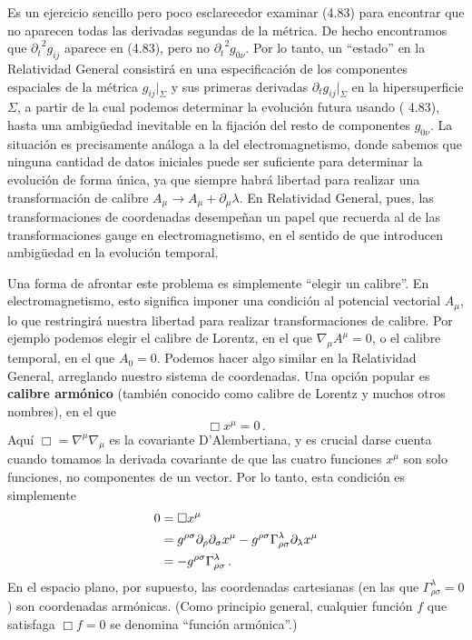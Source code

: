 \documentclass[11pt,b5paper,openany,twoside]{book}
\newcommand{\p}[1]{{\partial_{#1}}}
\begin{document}
Es un ejercicio sencillo pero poco esclarecedor examinar (4.83) para encontrar que no aparecen todas las derivadas segundas de la métrica.
De hecho encontramos que $\p{t}^2g_{ij}$ aparece en (4.83), pero no $\p{t}^2g_{0\nu}$.
Por lo tanto, un ``estado'' en la Relatividad General consistirá en una especificación de los componentes espaciales de la métrica $g_{ij}|_\Sigma$ y sus primeras derivadas $\p{t}g_{ij}|_\Sigma$ en la hipersuperficie $\Sigma$, a partir de la cual podemos determinar la evolución futura usando ( 4.83), hasta una ambigüedad inevitable en la fijación del resto de componentes $g_{0\nu}$.
La situación es precisamente análoga a la del electromagnetismo, donde sabemos que ninguna cantidad de datos iniciales puede ser suficiente para determinar la evolución de forma única, ya que siempre habrá libertad para realizar una transformación de calibre $A_\mu \rightarrow A_\mu +\p\mu\lambda$.
En Relatividad General, pues, las transformaciones de coordenadas desempeñan un papel que recuerda al de las transformaciones gauge en electromagnetismo, en el sentido de que introducen ambigüedad en la evolución temporal.

Una forma de afrontar este problema es simplemente ``elegir un calibre''. En electromagnetismo, esto significa imponer una condición al potencial vectorial $A_\mu$, lo que restringirá nuestra libertad para realizar transformaciones de calibre.
Por ejemplo podemos elegir el calibre de Lorentz, en el que $\nabla_\mu A^\mu=0$, o el calibre temporal, en el que $A_0=0$.
Podemos hacer algo similar en la Relatividad General, arreglando nuestro sistema de coordenadas.
Una opción popular es {\bf calibre armónico} (también conocido como calibre de Lorentz y muchos otros nombres), en el que
\begin{equation}
\Box x^\mu =0\,.\label{4.84}
\end{equation}
Aquí $\Box = \nabla^\mu\nabla_\mu$ es la covariante D'Alembertiana, y es crucial darse cuenta cuando tomamos la derivada covariante de que las cuatro funciones $x^\mu$ son solo funciones, no componentes de un vector.
Por lo tanto, esta condición es simplemente
\begin{align}
0 &=  \Box x^\mu \notag \\
&=  g^{\rho\sigma}\p\rho\p\sigma x^\mu - g^{\rho\sigma}
\Gamma^\lambda_{\rho\sigma}\p\lambda x^\mu \notag \\
&=  -g^{\rho\sigma}\Gamma^\lambda_{\rho\sigma}\,. \label{4.85}
\end{align}
En el espacio plano, por supuesto, las coordenadas cartesianas (en las que $\Gamma^\lambda_{\rho\sigma}=0$) son coordenadas armónicas.
(Como principio general, cualquier función $f$ que satisfaga $\Box f=0$ se denomina ``función armónica''.)
\end{document}
